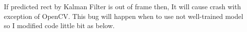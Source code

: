 
\begin{DoxyRefList}
\item[\label{bug__bug000001}%
\Hypertarget{bug__bug000001}%
Member \mbox{\hyperlink{class_c_track_a0f4fc1dc488e8ae339e988962dae6873}{C\+Track\+:\+:Rect\+Update}} (const \mbox{\hyperlink{class_c_region}{C\+Region}} \&region, bool data\+Correct, cv\+::\+U\+Mat prev\+Frame, cv\+::\+U\+Mat curr\+Frame)]If predicted rect by Kalman Filter is out of frame then, It will cause crash with exception of Open\+CV. This bug will happen when to use not well-\/trained model so I modified code little bit as below. 
\end{DoxyRefList}